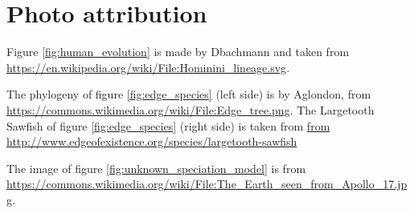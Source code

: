 \section{Photo attribution}

Figure \ref{fig:human_evolution} is made by Dbachmann 
and taken from \url{https://en.wikipedia.org/wiki/File:Hominini_lineage.svg}.

The phylogeny of figure \ref{fig:edge_species} (left side)
is by Aglondon, from \url{https://commons.wikimedia.org/wiki/File:Edge_tree.png}.
The Largetooth Sawfish of figure \ref{fig:edge_species} (right side)
is taken from \url{from http://www.edgeofexistence.org/species/largetooth-sawfish}

The image of figure \ref{fig:unknown_speciation_model}
is from \url{https://commons.wikimedia.org/wiki/File:The_Earth_seen_from_Apollo_17.jpg}.

